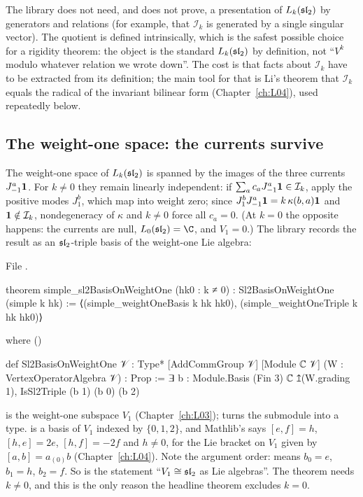 \begin{remark}
The library does not need, and does not prove, a presentation of $L_k(\mathfrak{sl}_2)$ by generators
and relations (for example, that $\mathcal{I}_k$ is generated by a single singular vector). The
quotient is defined intrinsically, which is the safest possible choice for a rigidity theorem: the
object is the standard $L_k(\mathfrak{sl}_2)$ by definition, not ``$V^k$ modulo whatever relation we wrote
down''. The cost is that facts about $\mathcal{I}_k$ have to be extracted from its definition; the
main tool for that is Li's theorem that $\mathcal{I}_k$ equals the radical of the invariant bilinear
form (Chapter~\ref{ch:L04}), used repeatedly below.
\end{remark}

\subsection{The weight-one space: the currents survive}

The weight-one space of $L_k(\mathfrak{sl}_2)$ is spanned by the images of the three currents
$J^a_{-1}\mathbf{1}$. For $k \neq 0$ they remain linearly independent: if
$\sum_a c_a J^a_{-1}\mathbf{1} \in \mathcal{I}_k$, apply the positive modes $J^b_1$, which map into
weight zero; since $J^b_1 J^a_{-1}\mathbf{1} = k\,\kappa(b,a)\mathbf{1}$ and $\mathbf{1}\notin\mathcal{I}_k$,
nondegeneracy of $\kappa$ and $k\neq0$ force all $c_a=0$. (At $k=0$ the opposite happens: the
currents are null, $L_0(\lninesl)=\C$, and $V_1 = 0$.) The library records the result as an
$\mathfrak{sl}_2$-triple basis of the weight-one Lie algebra:

\noindent File .
\begin{leancode}
theorem simple_sl2BasisOnWeightOne (hk0 : k ≠ 0) : Sl2BasisOnWeightOne (simple k hk) :=
  ⟨(simple_weightOneBasis k hk hk0), (simple_weightOneTriple k hk hk0)⟩
\end{leancode}
where ()
\begin{leancode}
def Sl2BasisOnWeightOne {𝒱 : Type*} [AddCommGroup 𝒱] [Module ℂ 𝒱]
    (W : VertexOperatorAlgebra 𝒱) : Prop :=
  ∃ b : Module.Basis (Fin 3) ℂ ↥(W.grading 1), IsSl2Triple (b 1) (b 0) (b 2)
\end{leancode}

\begin{dictionary}
 is the weight-one subspace $V_1$ (Chapter~\ref{ch:L03});  turns the
submodule into a type.  is a basis of $V_1$ indexed by
$\{0,1,2\}$, and Mathlib's  says $[e,f]=h$, $[h,e]=2e$, $[h,f]=-2f$ and
$h\ne0$, for the Lie bracket on $V_1$ given by $[a,b] = a_{(0)}b$ (Chapter~\ref{ch:L04}). Note the
argument order:  means $b_0 = e$, $b_1 = h$, $b_2 = f$. So
 is the statement ``$V_1\cong\mathfrak{sl}_2$ as Lie algebras''. The theorem
 needs $k\ne0$, and this is the only reason the headline theorem
excludes $k=0$.
\end{dictionary}

